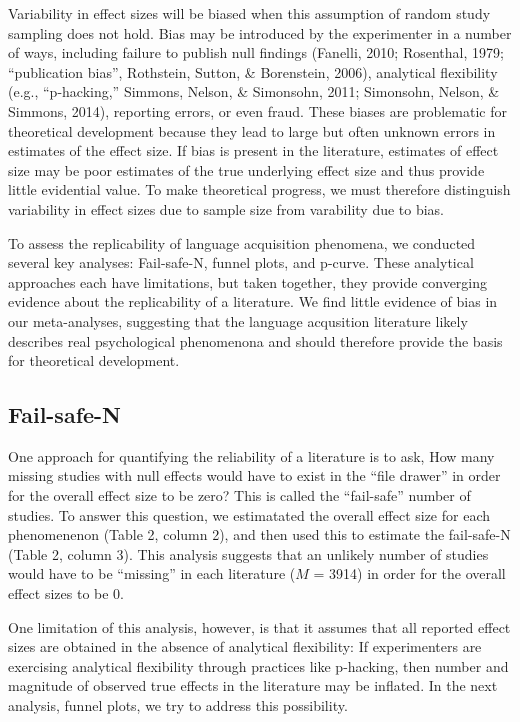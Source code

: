 \documentclass[american,floatsintext,man]{apa6}
\begin{document}
Variability in effect sizes will be biased when this assumption of
random study sampling does not hold. Bias may be introduced by the
experimenter in a number of ways, including failure to publish null
findings (Fanelli, 2010; Rosenthal, 1979; ``publication bias'',
Rothstein, Sutton, \& Borenstein, 2006), analytical flexibility (e.g.,
``p-hacking,'' Simmons, Nelson, \& Simonsohn, 2011; Simonsohn, Nelson,
\& Simmons, 2014), reporting errors, or even fraud. These biases are
problematic for theoretical development because they lead to large but
often unknown errors in estimates of the effect size. If bias is present
in the literature, estimates of effect size may be poor estimates of the
true underlying effect size and thus provide little evidential value. To
make theoretical progress, we must therefore distinguish variability in
effect sizes due to sample size from varability due to bias.

To assess the replicability of language acquisition phenomena, we
conducted several key analyses: Fail-safe-N, funnel plots, and p-curve.
These analytical approaches each have limitations, but taken together,
they provide converging evidence about the replicability of a
literature. We find little evidence of bias in our meta-analyses,
suggesting that the language acqusition literature likely describes real
psychological phenomenona and should therefore provide the basis for
theoretical development.

\subsection{Fail-safe-N}\label{fail-safe-n}

One approach for quantifying the reliability of a literature is to ask,
How many missing studies with null effects would have to exist in the
\enquote{file drawer} in order for the overall effect size to be zero?
This is called the \enquote{fail-safe} number of studies. To answer this
question, we estimatated the overall effect size for each phenomenenon
(Table 2, column 2), and then used this to estimate the fail-safe-N
(Table 2, column 3). This analysis suggests that an unlikely number of
studies would have to be \enquote{missing} in each literature (\(M\) =
3914) in order for the overall effect sizes to be 0.

One limitation of this analysis, however, is that it assumes that all
reported effect sizes are obtained in the absence of analytical
flexibility: If experimenters are exercising analytical flexibility
through practices like p-hacking, then number and magnitude of observed
true effects in the literature may be inflated. In the next analysis,
funnel plots, we try to address this possibility.
\end{document}
